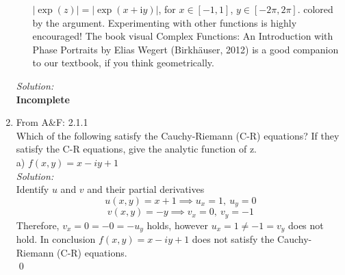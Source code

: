 \documentclass[10pt]{amsart}
\newcommand{\I}{\mathrm{i}}
\theoremstyle{nonumberplain}
\begin{document}
\begin{enumerate}[label={\bf {\arabic*}:}]
\begin{itemize}
$|\exp (z)|=|\exp (x+\I y)|$, for $x \in[-1,1]$, $y \in[-2 \pi, 2
\pi]$. colored by the argument. Experimenting with other functions is
highly encouraged! The book visual Complex Functions: An Introduction
with Phase Portraits by Elias Wegert (Birkhäuser, 2012) is a good
companion to our textbook, if you think geometrically.
\end{itemize}
\textit{Solution:} \\
\textbf{Incomplete} \\
\item From A\&F: 2.1.1 \\
Which of the following satisfy the Cauchy-Riemann (C-R) equations? If they satisfy the C-R equations, give the analytic function of z. \\
a) $f(x, y) = x - iy + 1$ \\
\textit{Solution:} \\
Identify $u$ and $v$ and their partial derivatives
$$ u(x,y) = x + 1 \implies u_x = 1, \: u_y = 0$$
$$v(x,y) = - y \implies v_x = 0, \: v_y = -1$$
Therefore, $v_x = 0 = - 0 = - u_y$ holds, however $u_x = 1 \neq - 1 = v_y$ does not hold.
In conclusion $f(x, y) = x - iy + 1$ does not satisfy the Cauchy-Riemann (C-R) equations.\\
\qed


\end{enumerate}
\end{document}
